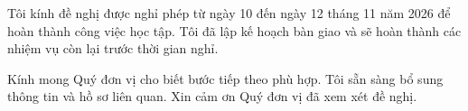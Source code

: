 Tôi kính đề nghị được nghỉ phép từ ngày 10 đến ngày 12 tháng 11 năm 2026 để hoàn thành công việc học tập. Tôi đã lập kế hoạch bàn giao và sẽ hoàn thành các nhiệm vụ còn lại trước thời gian nghỉ.

Kính mong Quý đơn vị cho biết bước tiếp theo phù hợp. Tôi sẵn sàng bổ sung thông tin và hồ sơ liên quan. Xin cảm ơn Quý đơn vị đã xem xét đề nghị.
